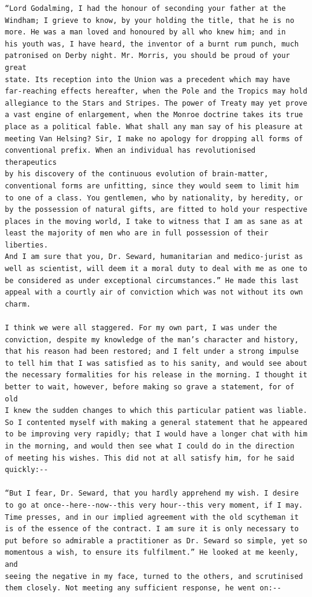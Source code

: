 \documentclass{article}
\begin{document}
\begin{verbatim}
“Lord Godalming, I had the honour of seconding your father at the
Windham; I grieve to know, by your holding the title, that he is no
more. He was a man loved and honoured by all who knew him; and in
his youth was, I have heard, the inventor of a burnt rum punch, much
patronised on Derby night. Mr. Morris, you should be proud of your great
state. Its reception into the Union was a precedent which may have
far-reaching effects hereafter, when the Pole and the Tropics may hold
allegiance to the Stars and Stripes. The power of Treaty may yet prove
a vast engine of enlargement, when the Monroe doctrine takes its true
place as a political fable. What shall any man say of his pleasure at
meeting Van Helsing? Sir, I make no apology for dropping all forms of
conventional prefix. When an individual has revolutionised therapeutics
by his discovery of the continuous evolution of brain-matter,
conventional forms are unfitting, since they would seem to limit him
to one of a class. You gentlemen, who by nationality, by heredity, or
by the possession of natural gifts, are fitted to hold your respective
places in the moving world, I take to witness that I am as sane as at
least the majority of men who are in full possession of their liberties.
And I am sure that you, Dr. Seward, humanitarian and medico-jurist as
well as scientist, will deem it a moral duty to deal with me as one to
be considered as under exceptional circumstances.” He made this last
appeal with a courtly air of conviction which was not without its own
charm.

I think we were all staggered. For my own part, I was under the
conviction, despite my knowledge of the man’s character and history,
that his reason had been restored; and I felt under a strong impulse
to tell him that I was satisfied as to his sanity, and would see about
the necessary formalities for his release in the morning. I thought it
better to wait, however, before making so grave a statement, for of old
I knew the sudden changes to which this particular patient was liable.
So I contented myself with making a general statement that he appeared
to be improving very rapidly; that I would have a longer chat with him
in the morning, and would then see what I could do in the direction
of meeting his wishes. This did not at all satisfy him, for he said
quickly:--

“But I fear, Dr. Seward, that you hardly apprehend my wish. I desire
to go at once--here--now--this very hour--this very moment, if I may.
Time presses, and in our implied agreement with the old scytheman it
is of the essence of the contract. I am sure it is only necessary to
put before so admirable a practitioner as Dr. Seward so simple, yet so
momentous a wish, to ensure its fulfilment.” He looked at me keenly, and
seeing the negative in my face, turned to the others, and scrutinised
them closely. Not meeting any sufficient response, he went on:--


\end{verbatim}
\end{document}
